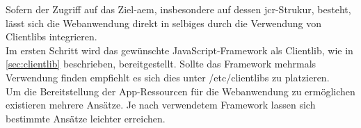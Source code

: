 
\label{sec:direkte-integration-in-das-aem}
Sofern der Zugriff auf das Ziel-\ac{aem}, insbesondere auf dessen \ac{jcr}-Strukur, besteht, lässt sich die Webanwendung direkt in selbiges durch die Verwendung von Clientlibs integrieren.\\
Im ersten Schritt wird das gewünschte JavaScript-Framework als Clientlib, wie in \autoref{sec:clientlib} beschrieben, bereitgestellt. Sollte das Framework mehrmals Verwendung finden empfiehlt es sich dies unter /etc/clientlibs zu platzieren. \\
Um die Bereitstellung der App-Ressourcen für die Webanwendung zu ermöglichen existieren mehrere Ansätze. Je nach verwendetem Framework lassen sich bestimmte Ansätze leichter erreichen.





